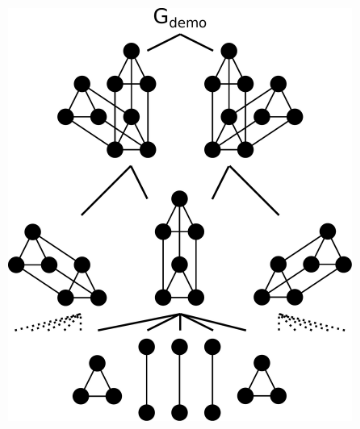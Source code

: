 \begin{figure}
\begin{subfigure}{0.3\linewidth}
    \caption{}\label{fig:demo_graph:comdrp}
  \end{subfigure}%
  \hfill
  \begin{subfigure}{0.3\linewidth}\centering
    \includegraphics[height=\myMinHeight]{../../img/svg/3xc2c3_new_candrp}
    \caption{}\label{fig:demo_graph:candrp}
  \end{subfigure}%

\end{figure}
